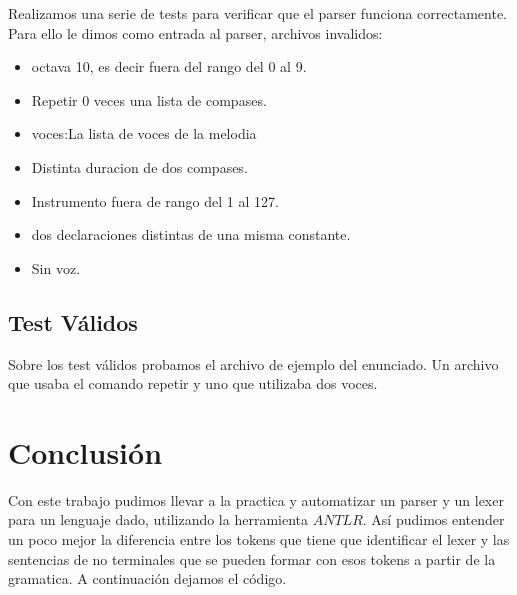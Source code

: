\documentclass[a4paper]{article}
\begin{document}
Realizamos una serie de tests para verificar que el parser funciona correctamente. Para ello le dimos como entrada al parser, archivos invalidos:

\begin{itemize}

\item octava 10, es decir fuera del rango del 0 al 9.
\item Repetir 0 veces una lista de compases.
\item voces:La lista de voces de la melodia
\item Distinta duracion de dos compases.
\item Instrumento fuera de rango del 1 al 127.
\item dos declaraciones distintas de una misma constante.
\item Sin voz.

\end{itemize}

\subsection{Test Válidos}

Sobre los test válidos probamos el archivo de ejemplo del enunciado.
Un archivo que usaba el comando repetir y uno que utilizaba dos voces.

\section{Conclusión}
Con este trabajo pudimos llevar a la practica y automatizar un parser y un lexer para un lenguaje dado, utilizando la herramienta $ANTLR$.
Así pudimos entender un poco mejor la diferencia entre los tokens que tiene que identificar el lexer y las sentencias de no terminales que se
pueden formar con esos tokens a partir de la gramatica.
A continuación dejamos el código.


\end{document}
